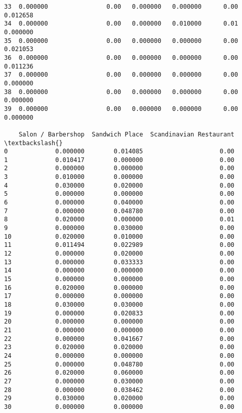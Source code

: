 \documentclass[11pt]{article}
\begin{document}
\begin{tcolorbox}[breakable, size=fbox, boxrule=.5pt, pad at break*=1mm, opacityfill=0]
\begin{Verbatim}[commandchars=\\\{\}]
33  0.000000                0.00   0.000000   0.000000      0.00     0.012658
34  0.000000                0.00   0.000000   0.010000      0.01     0.000000
35  0.000000                0.00   0.000000   0.000000      0.00     0.021053
36  0.000000                0.00   0.000000   0.000000      0.00     0.011236
37  0.000000                0.00   0.000000   0.000000      0.00     0.000000
38  0.000000                0.00   0.000000   0.000000      0.00     0.000000
39  0.000000                0.00   0.000000   0.000000      0.00     0.000000

    Salon / Barbershop  Sandwich Place  Scandinavian Restaurant  \textbackslash{}
0             0.000000        0.014085                     0.00
1             0.010417        0.000000                     0.00
2             0.000000        0.000000                     0.00
3             0.010000        0.000000                     0.00
4             0.030000        0.020000                     0.00
5             0.000000        0.000000                     0.00
6             0.000000        0.040000                     0.00
7             0.000000        0.048780                     0.00
8             0.020000        0.000000                     0.01
9             0.000000        0.030000                     0.00
10            0.020000        0.010000                     0.00
11            0.011494        0.022989                     0.00
12            0.000000        0.020000                     0.00
13            0.000000        0.033333                     0.00
14            0.000000        0.000000                     0.00
15            0.000000        0.000000                     0.00
16            0.020000        0.000000                     0.00
17            0.000000        0.000000                     0.00
18            0.030000        0.030000                     0.00
19            0.000000        0.020833                     0.00
20            0.000000        0.000000                     0.00
21            0.000000        0.000000                     0.00
22            0.000000        0.041667                     0.00
23            0.020000        0.020000                     0.00
24            0.000000        0.000000                     0.00
25            0.000000        0.048780                     0.00
26            0.020000        0.060000                     0.00
27            0.000000        0.030000                     0.00
28            0.000000        0.038462                     0.00
29            0.030000        0.020000                     0.00
30            0.000000        0.000000                     0.00

\end{Verbatim}
\end{tcolorbox}
\end{document}
